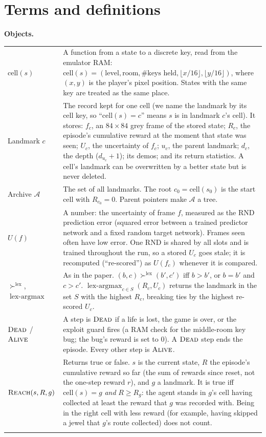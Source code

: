 \documentclass[10pt]{article}
\newcommand{\cA}{\mathcal{A}}
\newcommand{\lexargmax}{\operatorname*{lex\text{-}argmax}}
\newcommand{\cell}{\mathrm{cell}}
\newcommand{\Reach}{\textsc{Reach}}
\newcommand{\Dead}{\textsc{Dead}}
\newcommand{\Alive}{\textsc{Alive}}
\begin{document}
\section*{Terms and definitions}
\small
\newcommand{\gap}{\\\addlinespace[5pt]}
\textbf{Objects.}\par\smallskip
\noindent\begin{tabularx}{\linewidth}{@{}>{\raggedright\arraybackslash}p{3.0cm}X@{}}\toprule
$\cell(s)$ & A function from a state to a discrete key, read from the emulator RAM: $\cell(s) = (\text{level}, \text{room}, \#\text{keys held}, \lfloor x/16\rfloor, \lfloor y/16\rfloor)$, where $(x, y)$ is the player's pixel position. States with the same key are treated as the same place.\gap
Landmark $c$ & The record kept for one cell (we name the landmark by its cell key, so ``$\cell(s) = c$'' means $s$ is in landmark $c$'s cell). It stores: $f_c$, an $84{\times}84$ grey frame of the stored state; $R_c$, the episode's cumulative reward at the moment that state was seen; $U_c$, the uncertainty of $f_c$; $u_c$, the parent landmark; $d_c$, the depth ($d_{u_c} + 1$); its demos; and its return statistics. A cell's landmark can be overwritten by a better state but is never deleted.\gap
Archive $\cA$ & The set of all landmarks. The root $c_0 = \cell(s_0)$ is the start cell with $R_{c_0} = 0$. Parent pointers make $\cA$ a tree.\gap
$U(f)$ & A number: the uncertainty of frame $f$, measured as the RND prediction error (squared error between a trained predictor network and a fixed random target network). Frames seen often have low error. One RND is shared by all slots and is trained throughout the run, so a stored $U_c$ goes stale; it is recomputed (``re-scored'') as $U(f_c)$ whenever it is compared.\gap
$\succ^{\text{lex}}$, $\lexargmax$ & As in the paper. $(b,c) \succ^{\text{lex}} (b',c')$ iff $b > b'$, or $b = b'$ and $c > c'$. $\lexargmax_{c \in S}(R_c, U_c)$ returns the landmark in the set $S$ with the highest $R_c$, breaking ties by the highest re-scored $U_c$.\gap
$\Dead$ / $\Alive$ & A step is $\Dead$ if a life is lost, the game is over, or the exploit guard fires (a RAM check for the middle-room key bug; the bug's reward is set to 0). A $\Dead$ step ends the episode. Every other step is $\Alive$.\gap
$\Reach(s, R, g)$ & Returns true or false. $s$ is the current state, $R$ the episode's cumulative reward so far (the sum of rewards since reset, not the one-step reward $r$), and $g$ a landmark. It is true iff $\cell(s) = g$ \emph{and} $R \ge R_g$: the agent stands in $g$'s cell having collected at least the reward that $g$ was recorded with. Being in the right cell with less reward (for example, having skipped a jewel that $g$'s route collected) does not count.\gap

\end{tabularx}
\end{document}
